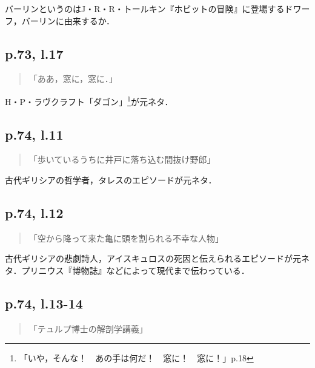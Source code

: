 \documentclass[10pt, a5paper, twoside]{jsarticle}
\theoremstyle{definition}
\begin{document}
			バーリンというのはJ・R・R・トールキン『ホビットの冒険』に登場するドワーフ，バーリンに由来するか．

		\subsection{p.73, l.17}

			\begin{quote}

				「ああ，窓に，窓に．」
				
			\end{quote}

			H・P・ラヴクラフト「ダゴン」\footnote{「いや，そんな！　あの手は何だ！　窓に！　窓に！」\cite{dgn}p.18}が元ネタ．

		\subsection{p.74, l.11}

			\begin{quote}

				「歩いているうちに井戸に落ち込む間抜け野郎」
				
			\end{quote}

			古代ギリシアの哲学者，タレスのエピソードが元ネタ\cite{dl}．

		\subsection{p.74, l.12}

			\begin{quote}

				「空から降って来た亀に頭を割られる不幸な人物」
				
			\end{quote}

			古代ギリシアの悲劇詩人，アイスキュロスの死因と伝えられるエピソードが元ネタ．プリニウス『博物誌』などによって現代まで伝わっている\cite{gonoji,naka}．

		\subsection{p.74, l.13-14}

			\begin{quote}

				「テュルプ博士の解剖学講義」
				
			\end{quote}
\end{document}
